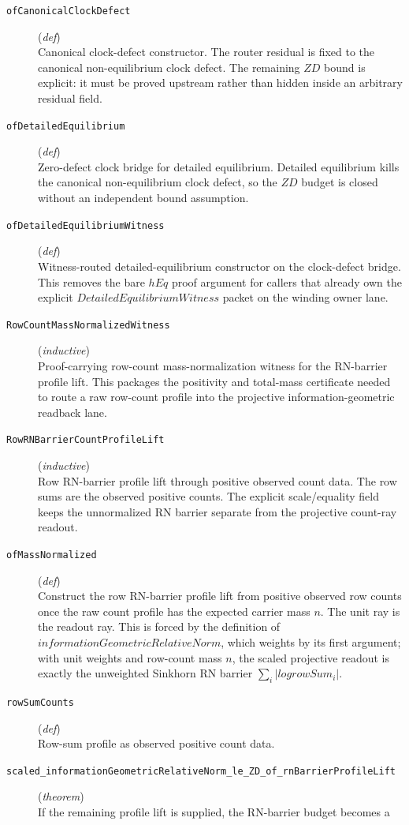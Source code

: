 \documentclass[11pt,a4paper]{article}
\begin{document}
\begin{description}
  \item[\texttt{ofCanonicalClockDefect}] (\textit{def}) \\ Canonical clock-defect constructor. 
The router residual is fixed to the canonical non-equilibrium clock defect. The 
remaining $ZD$ bound is explicit: it must be proved upstream rather than hidden 
inside an arbitrary residual field.
  \item[\texttt{ofDetailedEquilibrium}] (\textit{def}) \\ Zero-defect clock bridge for detailed equilibrium. 
Detailed equilibrium kills the canonical non-equilibrium clock defect, so the 
$ZD$ budget is closed without an independent bound assumption.
  \item[\texttt{ofDetailedEquilibriumWitness}] (\textit{def}) \\ Witness-routed detailed-equilibrium constructor on the clock-defect bridge. 
This removes the bare $hEq$ proof argument for callers that already own the 
explicit $DetailedEquilibriumWitness$ packet on the winding owner lane.
  \item[\texttt{RowCountMassNormalizedWitness}] (\textit{inductive}) \\ Proof-carrying row-count mass-normalization witness for the RN-barrier profile 
lift. 
This packages the positivity and total-mass certificate needed to route a raw 
row-count profile into the projective information-geometric readback lane.
  \item[\texttt{RowRNBarrierCountProfileLift}] (\textit{inductive}) \\ Row RN-barrier profile lift through positive observed count data. 
The row sums are the observed positive counts. The explicit scale/equality field 
keeps the unnormalized RN barrier separate from the projective count-ray 
readout.
  \item[\texttt{ofMassNormalized}] (\textit{def}) \\ Construct the row RN-barrier profile lift from positive observed row counts 
once the raw count profile has the expected carrier mass $n$. 
The unit ray is the readout ray. This is forced by the definition of 
$informationGeometricRelativeNorm$, which weights by its first argument; with 
unit weights and row-count mass $n$, the scaled projective readout is exactly 
the unweighted Sinkhorn RN barrier $\sum _i  |log rowSum_i |$.
  \item[\texttt{rowSumCounts}] (\textit{def}) \\ Row-sum profile as observed positive count data.
  \item[\texttt{scaled\_informationGeometricRelativeNorm\_le\_ZD\_of\_rnBarrierProfileLift}] (\textit{theorem}) \\ If the remaining profile lift is supplied, the RN-barrier budget becomes a 

\end{description}
\end{document}
